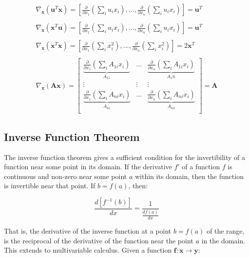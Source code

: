\begin{equation}
\begin{array}{l}
\nabla_\mathbf{x} \left(\mathbf{u}^T\mathbf{x}\right) = \left[\frac{\partial }{\partial x_1}\left(\sum_i u_i x_i\right),...,\frac{\partial }{\partial x_n}\left(\sum_i u_i x_i\right)\right] = \mathbf{u}^T\\
\\
\nabla_\mathbf{x} \left(\mathbf{x}^T\mathbf{u}\right) = \left[\frac{\partial }{\partial x_1}\left(\sum_i u_i x_i\right),...,\frac{\partial }{\partial x_n}\left(\sum_i u_i x_i\right)\right] = \mathbf{u}^T\\
\\
\nabla_\mathbf{x} \left(\mathbf{x}^T\mathbf{x}\right) = \left[\frac{\partial }{\partial x_1}\left(\sum_i x_i^2\right),...,\frac{\partial }{\partial x_n}\left(\sum_i x_i^2\right)\right] = 2\mathbf{x}^T\\
\\
\nabla_\mathbf{x} \left(\mathbf{Ax}\right) = \left[
\begin{array}{ccc} 
\underbrace{\frac{\partial }{\partial x_1}\left(\sum_i A_{1i} x_i\right)}_{A_{11}} &...& \underbrace{\frac{\partial }{\partial x_n}\left(\sum_i A_{1i} x_i\right)}_{A_1n}\\
\vdots&\vdots&\vdots\\
\underbrace{\frac{\partial }{\partial x_1}\left(\sum_i A_{ni} x_i\right)}_{A_{n1}} &...& \underbrace{\frac{\partial }{\partial x_n}\left(\sum_i A_{ni} x_i\right)}_{A_{nn}}\\
\end{array}\right] = \mathbf{A}
\end{array}
\end{equation}


\subsection{Inverse Function Theorem}
\label{sec:inverse_function_theorem}
The inverse function theorem gives a sufficient condition for the invertibility of a function near some point in its domain. If the derivative $f'$ of a function $f$ is continuous and non-zero near some point $a$ within its domain, then the function is invertible near that point. If $b = f(a)$, then:

\begin{equation}
\frac{d\left[f^{-1}(b)\right]}{dx} = \frac{1}{\frac{df(a)}{dx}}
\end{equation}

That is, the derivative of the inverse function at a point $b=f(a)$ of the range, is the reciprocal of the derivative of the function near the point $a$ in the domain. This extends to multivariable calculus. Given a function $\mathbf{f}: \mathbf{x} \rightarrow \mathbf{y}$:

